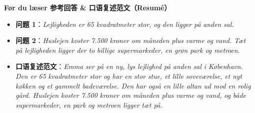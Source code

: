 \begin{answerbox}
\textbf{Før du læser 参考回答 \& 口语复述范文（Resumé）}
\begin{itemize}
  \item \textbf{问题 1}：\textit{Lejligheden er 65 kvadratmeter stor, og den ligger på anden sal.}
  \item \textbf{问题 2}：\textit{Huslejen koster 7.500 kroner om måneden plus varme og vand. Tæt på lejligheden ligger der to billige supermarkeder, en grøn park og metroen.}
  \item \textbf{口语复述范文}：\textit{Emma ser på en ny, lys lejlighed på anden sal i København. Den er 65 kvadratmeter stor og har en stor stue, et lille soveværelse, et nyt køkken og et gammelt badeværelse. Den har også en lille altan ud mod en rolig gård. Huslejen koster 7.500 kroner om måneden plus varme og vand, og både supermarkeder, en park og metroen ligger tæt på.}
\end{itemize}
\end{answerbox}

